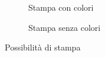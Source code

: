 \documentclass[]{article}
\begin{document}
\begin{figure}
	\centering
	\begin{subfigure}{.5\textwidth}
	  \centering
	  \caption{Stampa con colori}
	\end{subfigure}%
	\begin{subfigure}{.5\textwidth}
	  \centering
	  \caption{Stampa senza colori}
	\end{subfigure}
	\caption{Possibilità di stampa}
\end{figure}
	
	
\end{document}
